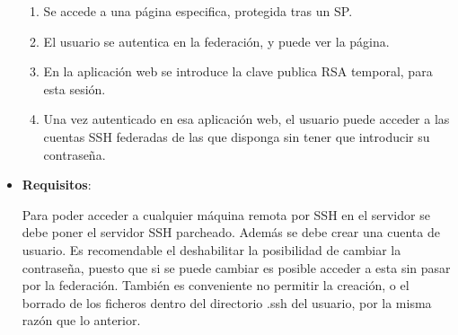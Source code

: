 \begin{itemize}
\begin{enumerate}
        \item Se accede a una página especifica, protegida tras un SP.

        \item El usuario se autentica en la federación, y puede ver la página.

        \item En la aplicación web se introduce la clave publica RSA temporal,
        para esta sesión.

        \item Una vez autenticado en esa aplicación web, el usuario puede
        acceder a las cuentas SSH federadas de las que disponga sin tener que
        introducir su contraseña.

    \end{enumerate}


    
    \item \textbf{Requisitos}:

    Para poder acceder a cualquier máquina remota por SSH en el servidor
    se debe poner el servidor SSH parcheado. Además se debe crear una cuenta de
    usuario. Es recomendable el deshabilitar la posibilidad de cambiar
    la contraseña, puesto que si se puede cambiar es
    posible acceder a esta sin pasar por la federación. También es
    conveniente no permitir la creación, o el borrado de los ficheros
    dentro del directorio .ssh del usuario, por la misma razón que lo anterior.


\end{itemize}
